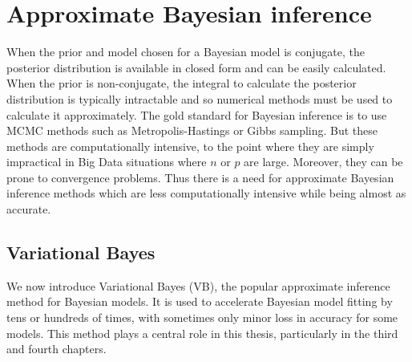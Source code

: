 

\section{Approximate Bayesian inference}

When the prior and model chosen for a Bayesian model is conjugate, the posterior
distribution is available in closed form and can be easily calculated.  When the
prior is non-conjugate, the integral to calculate the posterior distribution is
typically intractable and so numerical methods must be used to calculate it
approximately.  The gold standard for Bayesian inference is to use MCMC methods such as Metropolis-Hastings or Gibbs sampling. But these
methods are computationally intensive, to the point where they are simply
impractical in Big Data situations where $n$ or $p$ are large. Moreover, they
can be prone to convergence problems.
Thus there is a need for approximate Bayesian inference methods which are less
computationally intensive while being almost as accurate.

 
\subsection{Variational Bayes}
\label{sec:vb}

We now introduce Variational Bayes (VB), the popular approximate inference method for
Bayesian models. It is used to accelerate Bayesian model fitting by tens or
hundreds of times, with sometimes only minor loss in accuracy for some models.
This method plays a central role in this thesis, particularly in the third and
fourth chapters.


